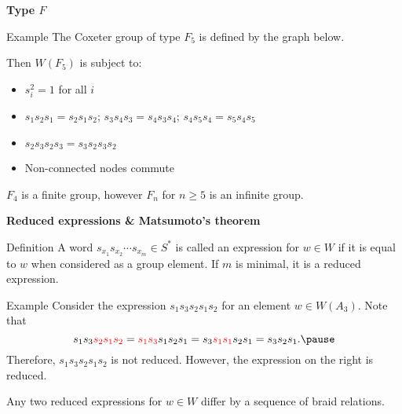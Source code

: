 \documentclass[9pt,handout]{beamer}
\newcommand{\<}{\langle}
\renewcommand{\>}{\rangle}
\begin{document}
\begin{frame}{\textbf{Type $F$}}\pause

\begin{block}{Example}
The Coxeter group of type $F_5$ is defined by the graph below.
\begin{figure}
\end{figure}
\vspace{-1em}
\pause Then $W(F_{5})$ is subject to: \pause 
\begin{itemize}
\item $s_{i}^{2}=1$ for all $i$ \pause
\item $s_{1}s_{2}s_{1}=s_{2}s_{1}s_{2}$; \quad $s_{3}s_{4}s_{3}=s_{4}s_{3}s_{4}$; \quad$s_{4}s_{5}s_{4}=s_{5}s_{4}s_{5}$ \pause 
\item $s_{2}s_{3}s_{2}s_{3}=s_{3}s_{2}s_{3}s_{2}$ \pause
\item Non-connected nodes commute
\end{itemize}

\medskip

\pause $F_{4}$ is a finite group, however $F_{n}$ for $n \geq  5$ is an infinite group.
\end{block}

\end{frame}


\begin{frame}{\textbf{Reduced expressions \& Matsumoto's theorem}} \pause

\begin{block}{Definition}
A word $s_{x_1}s_{x_2}\cdots s_{x_m}\in S^{*}$ is called an \alert{expression} for $w\in W$ if it is equal to $w$ when considered as a group element. If $m$ is minimal, it is a \alert{reduced expression}.
\end{block}

\pause
    
\begin{block}{Example}
Consider the expression $s_1s_3s_2s_1s_2$ for an element $w\in W(A_3)$. \pause Note that
	\[
    s_1s_3{\color{red}s_2s_1s_2}={\color{red}s_1s_3}s_1s_2s_1=s_3{\color{red}s_1s_1}s_2s_1=s_3s_2s_1. \pause
    \]
Therefore, $s_1s_3s_2s_1s_2$ is not reduced.  However, the expression on the right is reduced.
\end{block}

\pause

\begin{theorem}
Any two reduced expressions for $w\in W$ differ by a sequence of braid relations.
\end{theorem}

\end{frame}
\end{document}
